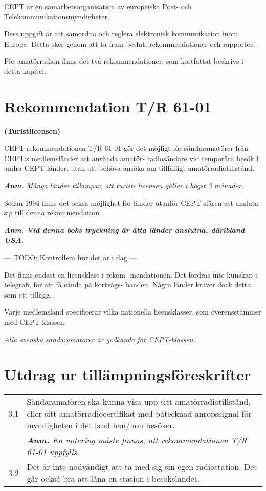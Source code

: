 CEPT är en samarbetsorganisation av europeiska Post- och Telekommunikationsmyndigheter.

Dess uppgift är att samordna och reglera elektronisk kommunikation inom Europa.
Detta sker genom att ta fram beslut, rekommendationer och rapporter.

För amatörradion finns det två rekommendationer, som kortfattat beskrivs i detta
kapitel.

\section{Rekommendation T/R 61-01}

\textbf{(Turistlicensen)}

CEPT-rekommendationen T/R 61-01
gör det möjligt för sändaramatörer från
CEPT:s medlemsländer att använda amatör-
radiosändare vid temporära besök i andra
CEPT-länder, utan att behöva ansöka om
tillfälligt amatörradiotillstånd.

\emph{\textbf{Anm.} Många länder tillämpar, att turist-
	licensen gäller i högst 3 månader.}

Sedan 1994 finns det också möjlighet för
länder utanför CEPT-sfären att ansluta sig
till denna rekommendation.

\emph\textbf{{Anm.} Vid denna boks tryckning är åtta
	länder anslutna, däribland USA.}

--- TODO: Kontrollera hur det är i dag ---

Det finns endast en licensklass i rekom-
mendationen. Det fordras inte kunskap
i telegrafi, för att få sända på kortvågs-
banden. Några länder kräver dock detta
som ett tillägg.

Varje medlemsland specificerar vilka
nationella licensklasser, som överensstämmer
med CEPT-klassen.

\emph{Alla svenska sändaramatörer är godkända
för CEPT-klassen.}

\section{Utdrag ur tillämpningsföreskrifter}

\begin{tabularx}{\columnwidth}{lX}
3.1 & Sändaramatören ska kunna visa upp
sitt amatörradiotillstånd, eller sitt
amatörradiocertifikat med påtecknad
anropssignal för myndigheten i det
land han/hon besöker.\vspace{1ex}\\
 & \emph{\textbf{Anm.} En notering måste finnas, att
 	rekommendationen T/R 61-01 uppfylls. }\vspace{1ex}\\
 
 3.2 & Det är inte nödvändigt att ta med sig
 sin egen radiostation. Det går också
 bra att låna en station i besökslandet.\vspace{1ex}\\
\end{tabularx}


